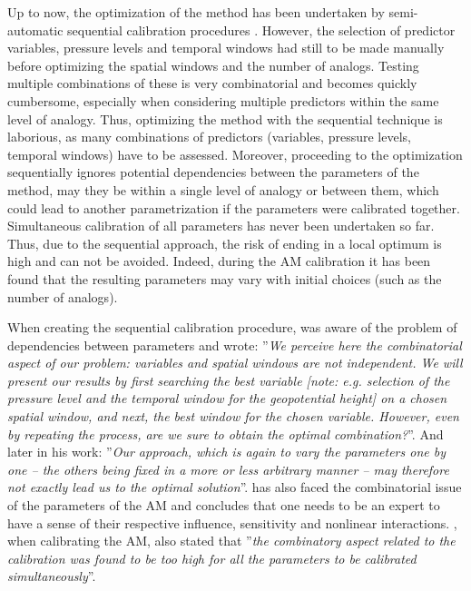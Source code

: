 \documentclass{ametsoc}
\begin{document}
Up to now, the optimization of the method has been undertaken by semi-automatic sequential calibration procedures \citep[see][for its definition]{Bontron2004, Horton2016}. However, the selection of predictor variables, pressure levels and temporal windows had still to be made manually before optimizing the spatial windows and the number of analogs. Testing multiple combinations of these is very combinatorial and becomes quickly cumbersome, especially when considering multiple predictors within the same level of analogy. Thus, optimizing the method with the sequential technique is laborious, as many combinations of predictors (variables, pressure levels, temporal windows) have to be assessed. Moreover, proceeding to the optimization sequentially ignores potential dependencies between the parameters of the method, may they be within a single level of analogy or between them, which could lead to another parametrization if the parameters were calibrated together. Simultaneous calibration of all parameters has never been undertaken so far. Thus, due to the sequential approach, the risk of ending in a local optimum is high and can not be avoided. Indeed, during the AM calibration it has been found that the resulting parameters may vary with initial choices (such as the number of analogs).

When creating the sequential calibration procedure, \citet{Bontron2004} was aware of the problem of dependencies between parameters and wrote: ''\textit{We perceive here the combinatorial aspect of our problem: variables and spatial windows are not independent. We will present our results by first searching the best variable [note: e.g. selection of the pressure level and the temporal window for the geopotential height] on a chosen spatial window, and next, the best window for the chosen variable. However, even by repeating the process, are we sure to obtain the optimal combination?}''. And later in his work: ''\textit{Our approach, which is again to vary the parameters one by one -- the others being fixed in a more or less arbitrary manner -- may therefore not exactly lead us to the optimal solution}''. \citet{Bliefernicht2010} has also faced the combinatorial issue of the parameters of the AM and concludes that one needs to be an expert to have a sense of their respective influence, sensitivity and nonlinear interactions. \citet{BenDaoud2010}, when calibrating the AM, also stated that ''\textit{the combinatory aspect related to the calibration was found to be too high for all the parameters to be calibrated simultaneously}''.
\end{document}
